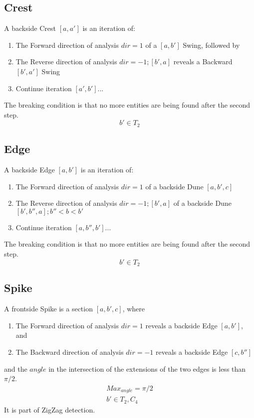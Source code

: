\documentclass{report}
\begin{document}
\subsection{Crest}
A backside Crest $[a,a']$ is an iteration of:
\begin{enumerate}
\item The Forward direction of analysis $dir=1$ of a $[a,b']$ Swing, followed by 
\item The Reverse direction of analysis $dir=-1;[b',a]$ reveals a Backward $[b',a']$ Swing
\item Continue iteration $[a',b']...$
\end{enumerate}
The breaking condition is that no more entities are being found after the second step.
\begin{equation}
b' \in T_{2}
\end{equation}

\subsection{Edge}
A backside Edge $[a,b']$ is an iteration of:
\begin{enumerate}
\item The Forward direction of analysis $dir=1$ of a backside Dune $[a,b',c]$
\item The Reverse direction of analysis $dir=-1;[b',a]$ of a backside Dune $[b',b'',a]; b''<b<b'$ 
\item Continue iteration $[a,b'',b']...$
\end{enumerate}
The breaking condition is that no more entities are being found after the second step.
\begin{equation}
b' \in T_{2}
\end{equation}

\subsection{Spike}
A frontside Spike is a section $[a,b',c]$, where
\begin{enumerate}
\item The Forward direction of analysis $dir=1$ reveals a backside Edge $[a,b']$, and
\item The Backward direction of analysis $dir=-1$ reveals a backside Edge $[c,b'']$ 
\end{enumerate}
and the $angle$ in the intersection of the extensions of the two edges is less than $\pi / 2$.\\
\begin{align}
Max_{angle}=\pi / 2\\
b' \in T_{2},C_{4}
\end{align}
It is part of ZigZag detection.
\end{document}
